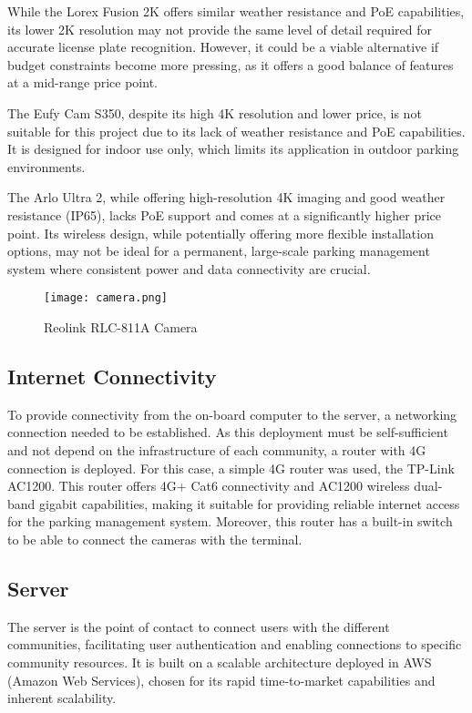 While the Lorex Fusion 2K offers similar weather resistance and PoE capabilities, its lower 2K resolution may not provide the same level of detail required for accurate license plate recognition. However, it could be a viable alternative if budget constraints become more pressing, as it offers a good balance of features at a mid-range price point.

The Eufy Cam S350, despite its high 4K resolution and lower price, is not suitable for this project due to its lack of weather resistance and PoE capabilities. It is designed for indoor use only, which limits its application in outdoor parking environments.

The Arlo Ultra 2, while offering high-resolution 4K imaging and good weather resistance (IP65), lacks PoE support and comes at a significantly higher price point. Its wireless design, while potentially offering more flexible installation options, may not be ideal for a permanent, large-scale parking management system where consistent power and data connectivity are crucial.

\begin{figure}
	\texttt{[image: camera.png]}
	\caption{Reolink RLC-811A Camera}\label{fig:camera}
\end{figure}

\subsection{Internet Connectivity}

To provide connectivity from the on-board computer to the server, a networking connection needed to be established. As this deployment must be self-sufficient and not depend on the infrastructure of each community, a router with 4G connection is deployed. For this case, a simple 4G router was used, the TP-Link AC1200. This router offers 4G+ Cat6 connectivity and AC1200 wireless dual-band gigabit capabilities, making it suitable for providing reliable internet access for the parking management system. Moreover, this router has a built-in switch to be able to connect the cameras with the terminal.

\subsection{Server}

The server is the point of contact to connect users with the different communities, facilitating user authentication and enabling connections to specific community resources. It is built on a scalable architecture deployed in AWS (Amazon Web Services), chosen for its rapid time-to-market capabilities and inherent scalability.

